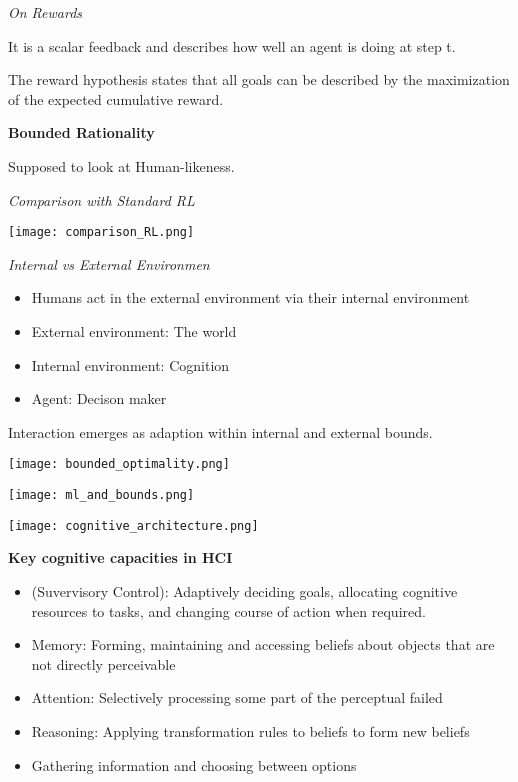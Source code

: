 \textit{On Rewards} \smallskip

It is a scalar feedback and describes how well an agent is doing at step t. 


The reward hypothesis states that all goals can be described by the maximization of the expected cumulative reward. 

\textbf{Bounded Rationality}

Supposed to look at Human-likeness.

\textit{Comparison with Standard RL} \smallskip

\begin{center}
	\texttt{[image: comparison\_RL.png]}
\end{center}

\textit{Internal vs External Environmen} \smallskip

\begin{itemize}[itemsep=-5pt, topsep=0pt, leftmargin=*]
	\item Humans act in the external environment via their internal environment
	\item External environment: The world
	\item Internal environment: Cognition
	\item Agent: Decison maker
\end{itemize}

Interaction emerges as adaption within internal and external bounds. 


\begin{center}
	\texttt{[image: bounded\_optimality.png]}
\end{center}


\begin{center}
	\texttt{[image: ml\_and\_bounds.png]}
\end{center}




\begin{center}
	\texttt{[image: cognitive\_architecture.png]}
\end{center}


\textbf{Key cognitive capacities in HCI} \smallskip

\begin{itemize}[itemsep=-5pt, topsep=0pt, leftmargin=*]
	\item (Suvervisory Control): Adaptively deciding goals, allocating cognitive resources to tasks, and changing course of action when required. 
	\item Memory: Forming, maintaining and accessing beliefs about objects that are not directly perceivable
	\item Attention: Selectively processing some part of the perceptual failed
	\item Reasoning: Applying transformation rules to beliefs to form new beliefs
	\item Gathering information and choosing between options
\end{itemize}

